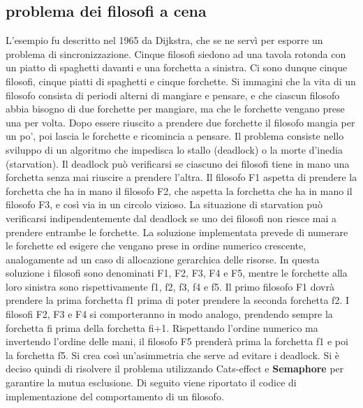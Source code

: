 \subsection{problema dei filosofi a cena}
L'esempio fu descritto nel 1965 da Dijkstra, che se ne servì per esporre un problema di sincronizzazione. Cinque filosofi siedono ad una tavola rotonda con un piatto di spaghetti davanti e una forchetta a sinistra. Ci sono dunque cinque filosofi, cinque piatti di spaghetti e cinque forchette. Si immagini che la vita di un filosofo consista di periodi alterni di mangiare e pensare, e che ciascun filosofo abbia bisogno di due forchette per mangiare, ma che le forchette vengano prese una per volta. Dopo essere riuscito a prendere due forchette il filosofo mangia per un po', poi lascia le forchette e ricomincia a pensare. Il problema consiste nello sviluppo di un algoritmo che impedisca lo stallo (deadlock) o la morte d'inedia (starvation). Il deadlock può verificarsi se ciascuno dei filosofi tiene in mano una forchetta senza mai riuscire a prendere l'altra. Il filosofo F1 aspetta di prendere la forchetta che ha in mano il filosofo F2, che aspetta la forchetta che ha in mano il filosofo F3, e così via in un circolo vizioso. La situazione di starvation può verificarsi indipendentemente dal deadlock se uno dei filosofi non riesce mai a prendere entrambe le forchette. La soluzione implementata prevede di numerare le forchette ed esigere che vengano prese in ordine numerico crescente, analogamente ad un caso di allocazione gerarchica delle risorse. In questa soluzione i filosofi sono denominati F1, F2, F3, F4 e F5, mentre le forchette alla loro sinistra sono rispettivamente f1, f2, f3, f4 e f5. Il primo filosofo F1 dovrà prendere la prima forchetta f1 prima di poter prendere la seconda forchetta f2. I filosofi F2, F3 e F4 si comporteranno in modo analogo, prendendo sempre la forchetta fi prima della forchetta fi+1. Rispettando l'ordine numerico ma invertendo l'ordine delle mani, il filosofo F5 prenderà prima la forchetta f1 e poi la forchetta f5. Si crea così un'asimmetria che serve ad evitare i deadlock. Si è deciso quindi di risolvere il problema utilizzando Cats-effect e \textbf{Semaphore} per garantire la mutua esclusione. Di seguito viene riportato il codice di implementazione del comportamento di un filosofo.

